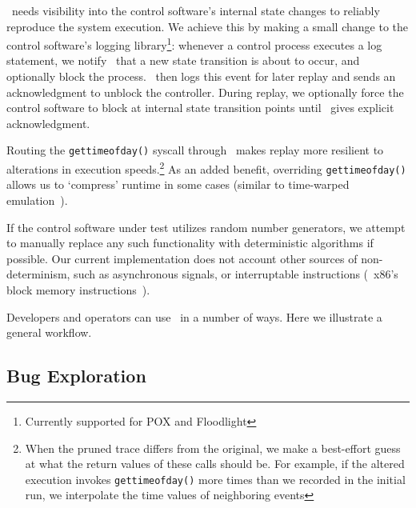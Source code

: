 \projectname~needs visibility into the control software's internal state
changes to reliably reproduce the system execution. We achieve this by
making a
small change to the control software's logging library\footnote{Currently
supported for POX
and Floodlight}: whenever a control process executes a log
statement, we notify \projectname~that a new state transition
is about to occur, and optionally block the process. \projectname~then logs this event for later replay and
sends an acknowledgment to unblock the controller. During replay,
we optionally force the control software to block at internal state transition points
until \projectname~gives explicit acknowledgment.

Routing the {\tt gettimeofday()} syscall
through \projectname~makes replay more resilient to alterations in execution
speeds.\footnote{When the pruned trace differs from the original, we make a
best-effort guess at what the return values of these calls should be. For example,
if the altered execution invokes {\tt gettimeofday()} more times than we recorded
in the initial run, we interpolate the time values of neighboring events}
As an added benefit, overriding {\tt gettimeofday()} allows us to `compress'
runtime in some cases (similar to time-warped emulation~\cite{Gupta06toinfinity}).

If the control software under test utilizes random number generators, we
attempt to manually replace any such functionality with deterministic
algorithms if possible. Our current implementation does not account other sources of non-determinism,
such as asynchronous signals,
or interruptable instructions (\eg~x86's block memory
instructions~\cite{Dunlap:2002:REI:844128.844148}).


Developers and operators can use \projectname~in a number of ways. Here we
illustrate a general workflow.

\subsection{Bug Exploration}

